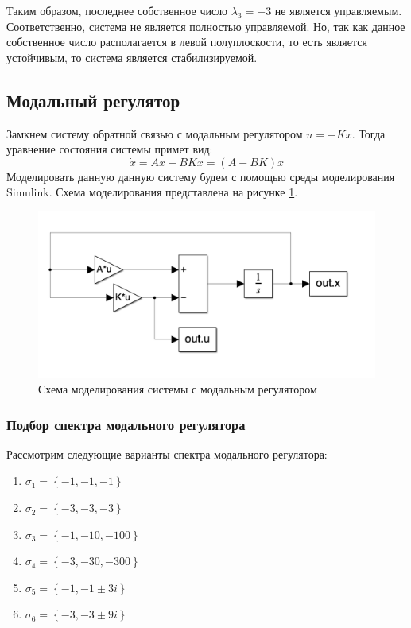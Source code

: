Таким образом, последнее собственное число $\lambda_3 = -3$ не является управляемым. Соответственно, система не является полностью управляемой. 
Но, так как данное собственное число располагается в левой полуплоскости, то есть является устойчивым, то система является стабилизируемой. 

\subsection{Модальный регулятор}
Замкнем систему обратной связью с модальным регулятором $u = -Kx$. Тогда уравнение состояния системы примет вид:
\begin{equation}
    \dot{x} = Ax - BKx = (A - BK)x 
\end{equation}
Моделировать данную данную систему будем с помощью среды моделирования Simulink. Схема моделирования представлена на рисунке \ref{fig:scheme1}. 
\begin{figure}[ht!]
    \centering
    \includegraphics[width=\textwidth]{media/scheme1.png}
    \caption{Схема моделирования системы с модальным регулятором}
    \label{fig:scheme1}
\end{figure}

\subsubsection{Подбор спектра модального регулятора}
Рассмотрим следующие варианты спектра модального регулятора: 
\begin{enumerate}
    \item $\sigma_1 = \left\{ -1, -1, -1 \right\}$
    \item $\sigma_2 = \left\{ -3, -3, -3 \right\}$
    \item $\sigma_3 = \left\{ -1, -10, -100 \right\}$
    \item $\sigma_4 = \left\{ -3, -30, -300 \right\}$
    \item $\sigma_5 = \left\{ -1, -1\pm3i \right\}$
    \item $\sigma_6 = \left\{ -3, -3\pm9i \right\}$
\end{enumerate}


